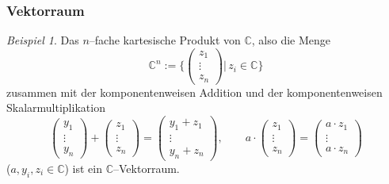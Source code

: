 \documentclass[hyperref={pdfpagelabels=false}]{beamer}
\theoremstyle{plain}%
\theoremstyle{definition}
\theoremstyle{remark}
\newtheorem*{beispiel}{Beispiel}
\begin{document}
\begin{frame}
\frametitle{Vektorraum}

\begin{beispiel}\label{LA_vr_cn} Das $n$--fache kartesische Produkt von $\mathbb C$, also die Menge
  	$$ \mathbb C^n := \{ \left( \begin{matrix} z_1 \\ \vdots \\ z_n 
     	\end{matrix} \right) \vert \, z_i \in \mathbb C \} $$
zusammen mit der komponentenweisen Addition und der komponentenweisen Skalarmultiplikation
  	$$ \left( \begin{matrix} y_1 \\ \vdots \\ y_n 
     	\end{matrix} \right) + \left( \begin{matrix} z_1 \\ \vdots \\ z_n 
     	\end{matrix} \right) = \left( \begin{matrix} y_1 + z_1 \\ \vdots \\ 
     	y_n + z_n  \end{matrix} \right), \qquad 
	 a \cdot \left( \begin{matrix} z_1 \\ \vdots \\ z_n 
     	\end{matrix} \right) = \left( \begin{matrix} a \cdot z_1 \\ \vdots \\ 
     	a \cdot z_n \end{matrix} \right) $$
($a, y_i, z_i \in \mathbb C$) ist ein $\mathbb C$--Vektorraum. 
\end{beispiel} 

\end{frame}
\end{document}
